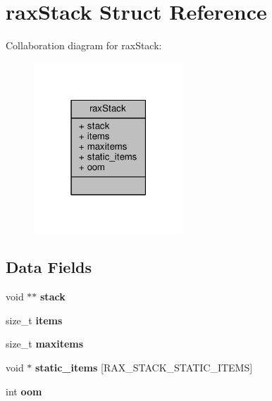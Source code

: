 \hypertarget{structraxStack}{}\section{rax\+Stack Struct Reference}
\label{structraxStack}


Collaboration diagram for rax\+Stack\+:\nopagebreak
\begin{figure}[H]
\begin{center}
\leavevmode
\includegraphics[width=159pt]{structraxStack__coll__graph}
\end{center}
\end{figure}
\subsection*{Data Fields}
\begin{DoxyCompactItemize}
\item 
\mbox{\label{structraxStack_a3a482a02da636a9c844e1c2bcf0c0e8e}} 
void $\ast$$\ast$ {\bfseries stack}
\item 
\mbox{\label{structraxStack_ae4cc1cd302cff15fd405314b0bd1bee9}} 
size\+\_\+t {\bfseries items}
\item 
\mbox{\label{structraxStack_a2e8d5064ac6ec6b2372e269191bdc1da}} 
size\+\_\+t {\bfseries maxitems}
\item 
\mbox{\label{structraxStack_a8077bcdde5a027aac7e931cf41d12082}} 
void $\ast$ {\bfseries static\+\_\+items} \mbox{[}R\+A\+X\+\_\+\+S\+T\+A\+C\+K\+\_\+\+S\+T\+A\+T\+I\+C\+\_\+\+I\+T\+E\+MS\mbox{]}
\item 
\mbox{\label{structraxStack_a069a0214f5210f38da70eed3422ad05f}} 
int {\bfseries oom}
\end{DoxyCompactItemize}


